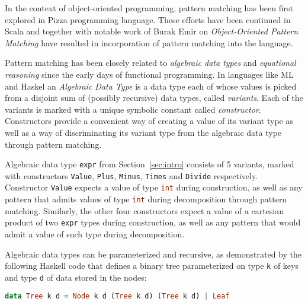 \documentclass[preprint]{sigplanconf}
\DeclareRobustCommand{\codehaskell}[1]{{\lstinline[breaklines=false,language=Haskell]{#1}}}
\DeclareRobustCommand{\codeocaml}[1]{{\lstinline[breaklines=false,language=Caml]{#1}}}
\begin{document}

In the context of object-oriented programming, pattern matching has been first 
explored in Pizza programming language\cite{Odersky97pizzainto}. These efforts 
have been continued in Scala\cite{Scala2nd} and together with notable work of 
Burak Emir on \emph{Object-Oriented Pattern Matching}\cite{EmirThesis} have 
resulted in incorporation of pattern matching into the language.



Pattern matching has been closely related to \emph{algebraic data types} and 
\emph{equational reasoning} since the early days of functional programming.
In languages like ML and Haskel an \emph{Algebraic Data Type} is a data type 
each of whose values is picked from a disjoint sum of (possibly recursive) data 
types, called \emph{variants}. Each of the variants is marked with a unique 
symbolic constant called \emph{constructor}. Constructors provide a 
convenient way of creating a value of its variant type as well as a way of 
discriminating its variant type from the algebraic data type through pattern 
matching.

Algebraic data type \codeocaml{expr} from Section~\ref{sec:intro} consists of 5 
variants, marked with constructors \codeocaml{Value}, \codeocaml{Plus}, 
\codeocaml{Minus}, \codeocaml{Times} and \codeocaml{Divide} respectively. 
Constructor \codeocaml{Value} expects a value of type \codeocaml{int} during 
construction, as well as any pattern that admits values of type \codeocaml{int} 
during decomposition through pattern matching. Similarly, the other four 
constructors expect a value of a cartesian product of two \codeocaml{expr} 
types during construction, as well as any pattern that would admit a value of 
such type during decomposition.

Algebraic data types can be parameterized and recursive, as demonstrated by the 
following Haskell code that defines a binary tree parameterized on type 
\codehaskell{k} of keys and type \codehaskell{d} of data stored in the nodes:

\begin{lstlisting}[language=Haskell]
data Tree k d = Node k d (Tree k d) (Tree k d) | Leaf
\end{lstlisting}
\end{document}
